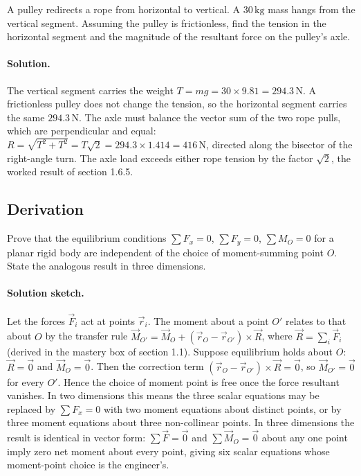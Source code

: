 \begin{exercise}
A pulley redirects a rope from horizontal to vertical. A
$30\,\si{\kilogram}$ mass hangs from the vertical segment. Assuming
the pulley is frictionless, find the tension in the horizontal
segment and the magnitude of the resultant force on the pulley's
axle.
\paragraph{Solution.} The vertical segment carries the weight $T = mg =
30 \times 9.81 = 294.3\,\text{N}$. A frictionless pulley does not change
the tension, so the horizontal segment carries the same $294.3\,\text{N}$.
The axle must balance the vector sum of the two rope pulls, which are
perpendicular and equal: $R = \sqrt{T^2 + T^2} = T\sqrt{2} = 294.3
\times 1.414 = 416\,\text{N}$, directed along the bisector of the
right-angle turn. The axle load exceeds either rope tension by the
factor $\sqrt{2}$, the worked result of section 1.6.5.
\end{exercise}

\subsection*{Derivation}

\begin{exercise}
Prove that the equilibrium conditions $\sum F_x = 0$, $\sum F_y = 0$,
$\sum M_O = 0$ for a planar rigid body are independent of the choice
of moment-summing point $O$. State the analogous result in three
dimensions.
\paragraph{Solution sketch.} Let the forces $\vec{F}_i$ act at points
$\vec{r}_i$. The moment about a point $O'$ relates to that about $O$ by
the transfer rule $\vec{M}_{O'} = \vec{M}_O + (\vec{r}_O - \vec{r}_{O'})
\times \vec{R}$, where $\vec{R} = \sum_i \vec{F}_i$ (derived in the
mastery box of section 1.1). Suppose equilibrium holds about $O$: $\vec{R}
= \vec{0}$ and $\vec{M}_O = \vec{0}$. Then the correction term
$(\vec{r}_O - \vec{r}_{O'}) \times \vec{R} = \vec{0}$, so $\vec{M}_{O'}
= \vec{0}$ for every $O'$. Hence the choice of moment point is free once
the force resultant vanishes. In two dimensions this means the three
scalar equations may be replaced by $\sum F_x = 0$ with two moment
equations about distinct points, or by three moment equations about
three non-collinear points. In three dimensions the result is identical
in vector form: $\sum \vec{F} = \vec{0}$ and $\sum \vec{M}_O = \vec{0}$
about any one point imply zero net moment about every point, giving six
scalar equations whose moment-point choice is the engineer's.
\end{exercise}

